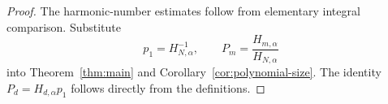 \documentclass[11pt]{article}
\newcommand{\1}{\mathbf{1}}
\begin{document}
\begin{proof}
The harmonic-number estimates follow from elementary integral comparison.
Substitute
\[
 p_1=H_{N,\alpha}^{-1},
 \qquad
 P_m=\frac{H_{m,\alpha}}{H_{N,\alpha}}
\]
into Theorem~\ref{thm:main} and Corollary~\ref{cor:polynomial-size}.  The
identity \(P_d=H_{d,\alpha}p_1\) follows directly from the definitions.
\end{proof}
\end{document}
